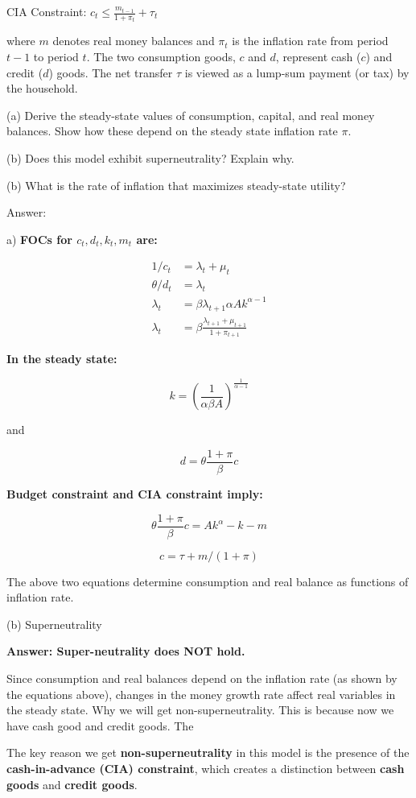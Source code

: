 CIA Constraint: $c_t\leq \frac{m_{t-1}}{1+\pi_t}+\tau_t$

where $m$ denotes real money balances and $\pi_t$ is the inflation rate from
period $t-1$ to period $t$. The two consumption goods, $c$ and $d$,
represent cash ($c$) and credit ($d$) goods. The net transfer $\tau$ is
viewed as a lump-sum payment (or tax) by the household.

(a) Derive the steady-state values of consumption, capital, and real money balances. Show how these depend on the steady state inflation rate $\pi$.  

(b) Does this model exhibit superneutrality? Explain why.

(b) What is the rate of inflation that maximizes steady-state utility?

Answer:

a) \textbf{FOCs for $c_t, d_t, k_t, m_t$ are:}

\begin{align}
1/c_t &= \lambda_t + \mu_t \\
\theta/d_t &= \lambda_t \\
\lambda_t &= \beta\lambda_{t+1}\alpha A k^{\alpha-1} \\
\lambda_t &= \beta\frac{\lambda_{t+1} + \mu_{t+1}}{1 + \pi_{t+1}}
\end{align}

\textbf{In the steady state:}

$$k = \left(\frac{1}{\alpha \beta A}\right)^{\frac{1}{\alpha-1}}$$

and

$$d = \theta\frac{1+\pi}{\beta}c$$

\textbf{Budget constraint and CIA constraint imply:}

$$\theta\frac{1+\pi}{\beta}c = Ak^\alpha - k - m$$

$$c = \tau + m/(1+\pi)$$

The above two equations determine consumption and real balance as functions of inflation rate.

(b) Superneutrality 

\textbf{Answer: Super-neutrality does NOT hold.}

Since consumption and real balances depend on the inflation rate (as shown by the equations above), changes in the money growth rate affect real variables in the steady state. Why we will get non-superneutrality. This is because now we have cash good and credit goods. The 

The key reason we get \textbf{non-superneutrality} in this model is the presence of the \textbf{cash-in-advance (CIA) constraint}, which creates a distinction between \textbf{cash goods} and \textbf{credit goods}.

